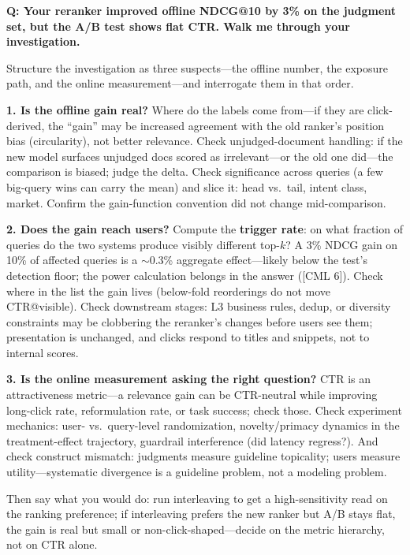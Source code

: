 \begin{interviewq}
\textbf{Q: Your reranker improved offline NDCG@10 by 3\% on the judgment set, but the A/B test shows flat CTR. Walk me through your investigation.}

 \quad {} \quad \badgefreq{\freqhigh}

\stronganswer

Structure the investigation as three suspects---the offline number, the exposure path, and the online measurement---and interrogate them in that order.

\textbf{1. Is the offline gain real?} Where do the labels come from---if they are click-derived, the ``gain'' may be increased agreement with the old ranker's position bias (circularity), not better relevance. Check unjudged-document handling: if the new model surfaces unjudged docs scored as irrelevant---or the old one did---the comparison is biased; judge the delta. Check significance across queries (a few big-query wins can carry the mean) and slice it: head vs.\ tail, intent class, market. Confirm the gain-function convention did not change mid-comparison.

\textbf{2. Does the gain reach users?} Compute the \textbf{trigger rate}: on what fraction of queries do the two systems produce visibly different top-$k$? A 3\% NDCG gain on 10\% of affected queries is a $\sim$0.3\% aggregate effect---likely below the test's detection floor; the power calculation belongs in the answer ([CML 6]). Check where in the list the gain lives (below-fold reorderings do not move CTR@visible). Check downstream stages: L3 business rules, dedup, or diversity constraints may be clobbering the reranker's changes before users see them; presentation is unchanged, and clicks respond to titles and snippets, not to internal scores.

\textbf{3. Is the online measurement asking the right question?} CTR is an attractiveness metric---a relevance gain can be CTR-neutral while improving long-click rate, reformulation rate, or task success; check those. Check experiment mechanics: user- vs.\ query-level randomization, novelty/primacy dynamics in the treatment-effect trajectory, guardrail interference (did latency regress?). And check construct mismatch: judgments measure guideline topicality; users measure utility---systematic divergence is a guideline problem, not a modeling problem.

Then say what you would do: run interleaving to get a high-sensitivity read on the ranking preference; if interleaving prefers the new ranker but A/B stays flat, the gain is real but small or non-click-shaped---decide on the metric hierarchy, not on CTR alone.


\end{interviewq}
